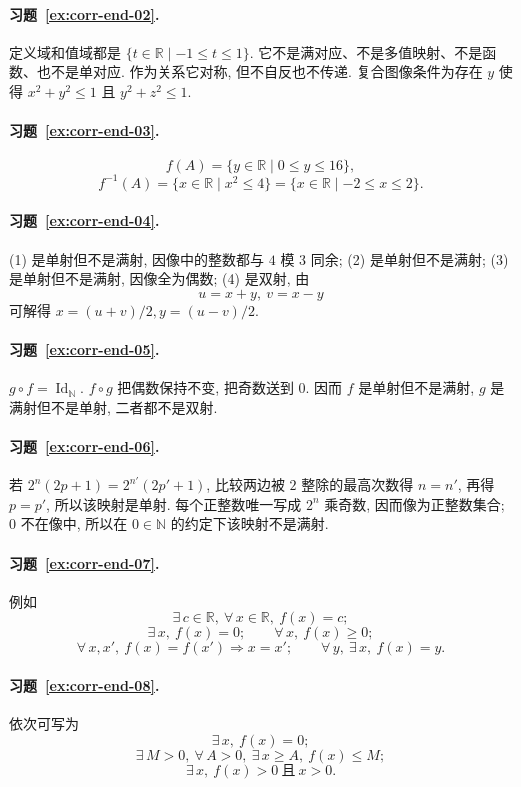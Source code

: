 \documentclass[usesamecnt, thmcnt=section, lang=cn, newtx, 10pt, scheme=chinese]{elegantbook}
\begin{document}
\paragraph*{习题~\ref{ex:corr-end-02}.}
定义域和值域都是 $\{t\in\mathbb R\mid -1\leq t\leq1\}$. 它不是满对应、不是多值映射、不是函数、也不是单对应. 作为关系它对称, 但不自反也不传递. 复合图像条件为存在 $y$ 使得 $x^2+y^2\leq1$ 且 $y^2+z^2\leq1$.

\paragraph*{习题~\ref{ex:corr-end-03}.}
\[
 f(A)=\{y\in\mathbb R\mid 0\leq y\leq16\},
\]
\[
 f^{-1}(A)=\{x\in\mathbb R\mid x^2\leq4\}
 =\{x\in\mathbb R\mid -2\leq x\leq2\}.
\]

\paragraph*{习题~\ref{ex:corr-end-04}.}
(1) 是单射但不是满射, 因像中的整数都与 $4$ 模 $3$ 同余; (2) 是单射但不是满射; (3) 是单射但不是满射, 因像全为偶数; (4) 是双射, 由
\[
 u=x+y,\ v=x-y
\]
可解得 $x=(u+v)/2,y=(u-v)/2$.

\paragraph*{习题~\ref{ex:corr-end-05}.}
$g\circ f=\operatorname{Id}_{\mathbb N}$. $f\circ g$ 把偶数保持不变, 把奇数送到 $0$. 因而 $f$ 是单射但不是满射, $g$ 是满射但不是单射, 二者都不是双射.

\paragraph*{习题~\ref{ex:corr-end-06}.}
若 $2^n(2p+1)=2^{n'}(2p'+1)$, 比较两边被 $2$ 整除的最高次数得 $n=n'$, 再得 $p=p'$, 所以该映射是单射. 每个正整数唯一写成 $2^n$ 乘奇数, 因而像为正整数集合; $0$ 不在像中, 所以在 $0\in\mathbb N$ 的约定下该映射不是满射.

\paragraph*{习题~\ref{ex:corr-end-07}.}
例如
\[
 \exists\,c\in\mathbb R,\ \forall\,x\in\mathbb R,\ f(x)=c;
\]
\[
 \exists\,x,\ f(x)=0;
\qquad
 \forall\,x,\ f(x)\geq0;
\]
\[
 \forall\,x,x',\ f(x)=f(x')\Rightarrow x=x';
\qquad
 \forall\,y,\ \exists\,x,\ f(x)=y.
\]

\paragraph*{习题~\ref{ex:corr-end-08}.}
依次可写为
\[
 \exists\,x,\ f(x)=0;
\]
\[
 \exists\,M>0,\ \forall\,A>0,\ \exists\,x\geq A,\ f(x)\leq M;
\]
\[
 \exists\,x,\ f(x)>0\ \text{且}\ x>0.
\]
\end{document}
